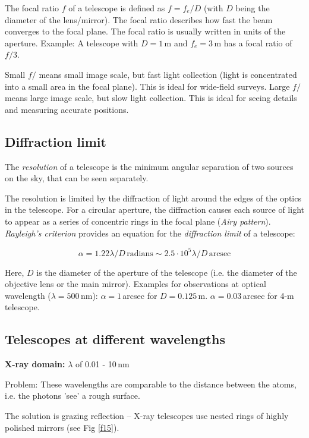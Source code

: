 The focal ratio $f$ of a telescope is defined as $f = f_e/D$ (with $D$ being the diameter of the lens/mirror). The focal ratio describes how fast the beam converges to the focal plane. The focal ratio is usually written in units of the aperture. Example: A telescope with $D = 1$\,m and $f_e = 3$\,m has a focal ratio of $f/3$. 

Small $f/$ means small image scale, but fast light collection (light is concentrated into a small area in the focal plane). This is ideal for wide-field surveys. Large $f/$ means large image scale, but slow light collection. This is ideal for seeing details and measuring accurate positions.

\subsection{Diffraction limit}

The \textit{resolution} of a telescope is the minimum angular separation of two sources on the sky, that can be seen separately. 

The resolution is limited by the diffraction of light around the edges of the optics in the telescope. For a circular aperture, the diffraction causes each source of light to appear as a series of concentric rings in the focal plane (\textit{Airy pattern}). \textit{Rayleigh's criterion} provides an equation for the \textit{diffraction limit} of a telescope:

\begin{equation}
\alpha = 1.22 \lambda / D\,\mathrm{radians} \sim 2.5 \cdot 10^5 \lambda / D\,\mathrm{arcsec}
\label{eq22}
\end{equation}

Here, $D$ is the diameter of the aperture of the telescope (i.e. the diameter of the objective lens or the main mirror). Examples for observations at optical wavelength ($\lambda = 500$\,nm): $\alpha = 1$\,arcsec for $D = 0.125$\,m. $\alpha = 0.03$\,arcsec for 4-m telescope.

\subsection{Telescopes at different wavelengths}

\textbf{X-ray domain:} $\lambda$ of 0.01 - 10\,nm

Problem: These wavelengths are comparable to the distance between the atoms, i.e. the photons 'see' a rough surface. 

The solution is grazing reflection -- X-ray telescopes use nested rings of highly polished mirrors (see Fig \ref{f15}).

